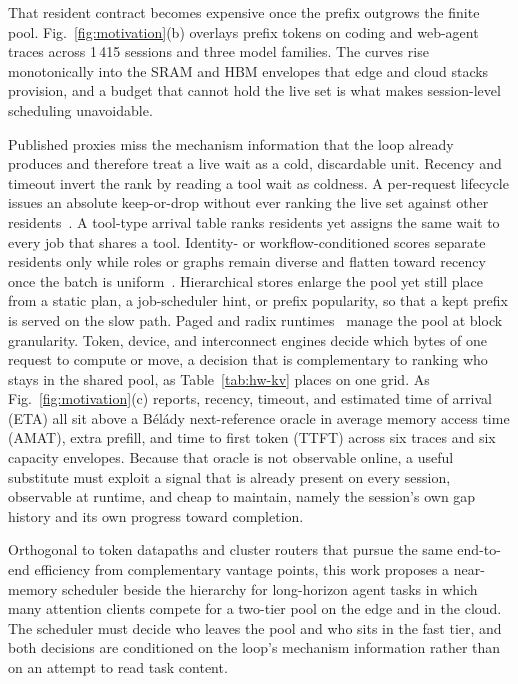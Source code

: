 That resident contract becomes expensive once the prefix outgrows the
finite pool. Fig.~\ref{fig:motivation}(b) overlays prefix tokens on
coding and web-agent traces across 1\,415 sessions and three model
families. The curves rise monotonically into the SRAM and HBM
envelopes that edge and cloud stacks provision, and a budget that
cannot hold the live set is what makes session-level scheduling
unavoidable.

Published proxies miss the mechanism information that the loop
already produces and therefore treat a live wait as a cold,
discardable unit. Recency and timeout invert the rank by reading a
tool wait as coldness. A per-request lifecycle issues an absolute
keep-or-drop without ever ranking the live set against other
residents~\cite{abhyankar_infercept_2024,li_continuum_2026}. A
tool-type arrival table ranks residents yet assigns the same wait to
every job that shares a tool. Identity- or workflow-conditioned
scores separate residents only while roles or graphs remain diverse
and flatten toward recency once the batch is
uniform~\cite{cachescout_2026,pan_kvflow_2025,zheng_pbkv_2026}.
Hierarchical stores enlarge the pool yet still place from a static
plan, a job-scheduler hint, or prefix popularity, so that a kept
prefix is served on the slow path. Paged and radix
runtimes~\cite{kwon_pagedattention_2023,zheng_sglang_2024} manage the
pool at block granularity. Token, device, and interconnect engines
decide which bytes of one request to compute or move, a decision
that is complementary to ranking who stays in the shared pool, as
Table~\ref{tab:hw-kv} places on one grid. As Fig.~\ref{fig:motivation}(c)
reports, recency, timeout, and estimated time of arrival (ETA) all
sit above a B\'el\'ady next-reference oracle in average memory
access time (AMAT), extra prefill, and time to first token (TTFT)
across six traces and six capacity envelopes. Because that oracle is not observable online, a
useful substitute must exploit a signal that is already present on
every session, observable at runtime, and cheap to maintain, namely
the session's own gap history and its own progress toward completion.

Orthogonal to token datapaths and cluster routers that pursue the
same end-to-end efficiency from complementary vantage points, this
work proposes a near-memory scheduler beside the hierarchy
for long-horizon agent tasks in which many attention clients compete
for a two-tier pool on the edge and in the cloud. The scheduler
must decide who leaves the pool and who sits in the fast tier, and
both decisions are conditioned on the loop's mechanism information
rather than on an attempt to read task content.

